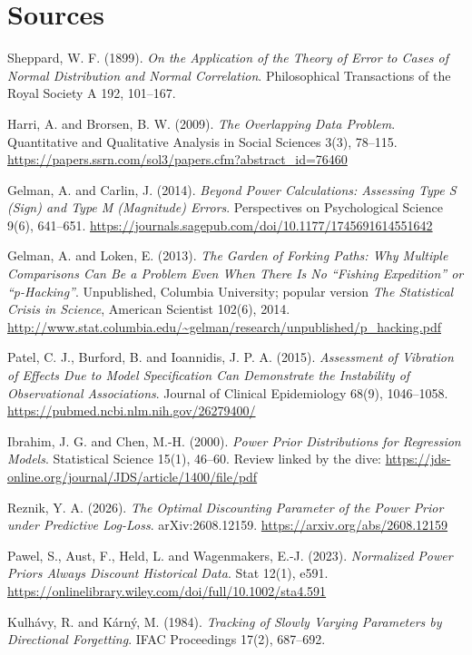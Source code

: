 \section*{Sources}
\begingroup\raggedright
\begin{enumerate}[label={[\arabic*]},leftmargin=2.5em]
\item Sheppard, W. F. (1899). \emph{On the Application of the Theory of Error to Cases of Normal Distribution and Normal Correlation}. Philosophical Transactions of the Royal Society A 192, 101--167.
\item Harri, A. and Brorsen, B. W. (2009). \emph{The Overlapping Data Problem}. Quantitative and Qualitative Analysis in Social Sciences 3(3), 78--115. \url{https://papers.ssrn.com/sol3/papers.cfm?abstract_id=76460}
\item Gelman, A. and Carlin, J. (2014). \emph{Beyond Power Calculations: Assessing Type S (Sign) and Type M (Magnitude) Errors}. Perspectives on Psychological Science 9(6), 641--651. \url{https://journals.sagepub.com/doi/10.1177/1745691614551642}
\item Gelman, A. and Loken, E. (2013). \emph{The Garden of Forking Paths: Why Multiple Comparisons Can Be a Problem Even When There Is No ``Fishing Expedition'' or ``p-Hacking''}. Unpublished, Columbia University; popular version \emph{The Statistical Crisis in Science}, American Scientist 102(6), 2014. \url{http://www.stat.columbia.edu/~gelman/research/unpublished/p_hacking.pdf}
\item Patel, C. J., Burford, B. and Ioannidis, J. P. A. (2015). \emph{Assessment of Vibration of Effects Due to Model Specification Can Demonstrate the Instability of Observational Associations}. Journal of Clinical Epidemiology 68(9), 1046--1058. \url{https://pubmed.ncbi.nlm.nih.gov/26279400/}
\item Ibrahim, J. G. and Chen, M.-H. (2000). \emph{Power Prior Distributions for Regression Models}. Statistical Science 15(1), 46--60. Review linked by the dive: \url{https://jds-online.org/journal/JDS/article/1400/file/pdf}
\item Reznik, Y. A. (2026). \emph{The Optimal Discounting Parameter of the Power Prior under Predictive Log-Loss}. arXiv:2608.12159. \url{https://arxiv.org/abs/2608.12159}
\item Pawel, S., Aust, F., Held, L. and Wagenmakers, E.-J. (2023). \emph{Normalized Power Priors Always Discount Historical Data}. Stat 12(1), e591. \url{https://onlinelibrary.wiley.com/doi/full/10.1002/sta4.591}
\item Kulh\'avy, R. and K\'arn\'y, M. (1984). \emph{Tracking of Slowly Varying Parameters by Directional Forgetting}. IFAC Proceedings 17(2), 687--692.

\end{enumerate}
